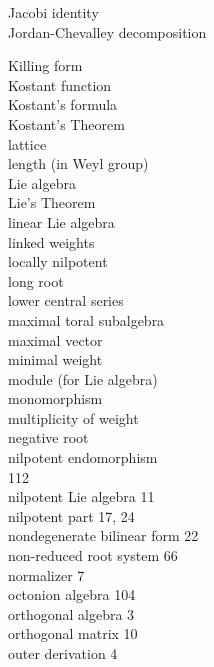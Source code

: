 \documentclass[10pt]{article}
\begin{document}
Jacobi identity\\
Jordan-Chevalley decomposition

Killing form\\
Kostant function\\
Kostant's formula\\
Kostant's Theorem\\
lattice\\
length (in Weyl group)\\
Lie algebra\\
Lie's Theorem\\
linear Lie algebra\\
linked weights\\
locally nilpotent\\
long root\\
lower central series\\
maximal toral subalgebra\\
maximal vector\\
minimal weight\\
module (for Lie algebra)\\
monomorphism\\
multiplicity of weight\\
negative root\\
nilpotent endomorphism\\
112\\
nilpotent Lie algebra 11\\
nilpotent part 17, 24\\
nondegenerate bilinear form 22\\
non-reduced root system 66\\
normalizer 7\\
octonion algebra 104\\
orthogonal algebra 3\\
orthogonal matrix 10\\
outer derivation 4
\end{document}
